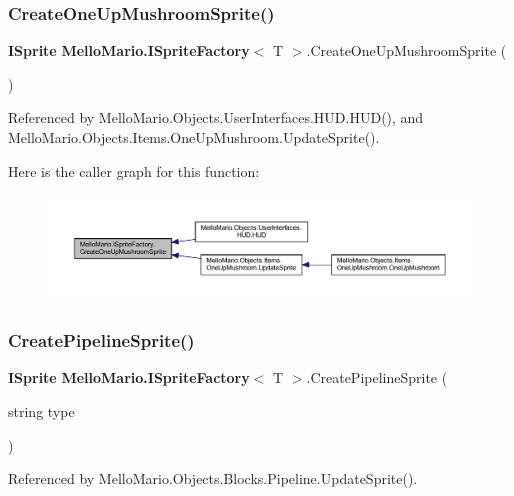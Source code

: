 \subsubsection{Create\+One\+Up\+Mushroom\+Sprite()}
{\footnotesize\ttfamily \textbf{ I\+Sprite} \textbf{ Mello\+Mario.\+I\+Sprite\+Factory}$<$ T $>$.Create\+One\+Up\+Mushroom\+Sprite (\begin{DoxyParamCaption}{ }\end{DoxyParamCaption})}



Referenced by Mello\+Mario.\+Objects.\+User\+Interfaces.\+H\+U\+D.\+H\+U\+D(), and Mello\+Mario.\+Objects.\+Items.\+One\+Up\+Mushroom.\+Update\+Sprite().

Here is the caller graph for this function\+:
\nopagebreak
\begin{figure}[H]
\begin{center}
\leavevmode
\includegraphics[width=350pt]{interfaceMelloMario_1_1ISpriteFactory_af0610c0c0204b652f13464f4ffac6cbf_icgraph}
\end{center}
\end{figure}
\mbox{\label{interfaceMelloMario_1_1ISpriteFactory_a4ff315150e1dd48bdf9909c780aa6b94}} 
\subsubsection{Create\+Pipeline\+Sprite()}
{\footnotesize\ttfamily \textbf{ I\+Sprite} \textbf{ Mello\+Mario.\+I\+Sprite\+Factory}$<$ T $>$.Create\+Pipeline\+Sprite (\begin{DoxyParamCaption}\item[{string}]{type }\end{DoxyParamCaption})}



Referenced by Mello\+Mario.\+Objects.\+Blocks.\+Pipeline.\+Update\+Sprite().

